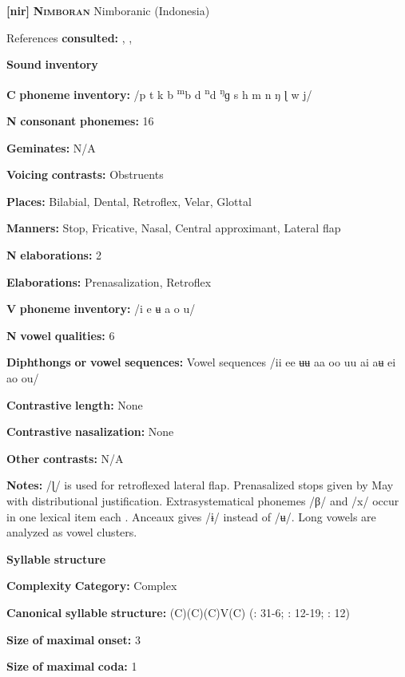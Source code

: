 \begin{styleBody}
\textbf{[nir]}   \textbf{\textsc{Nimboran}}  Nimboranic (Indonesia)

References \textbf{consulted:} \citet{Anceaux1965}, \citet{May1997}, \citet{MayMay1981}

\textbf{Sound} \textbf{inventory}

\textbf{C} \textbf{phoneme} \textbf{inventory:} /p t k b \textsuperscript{m}b d \textsuperscript{n}d \textsuperscript{ŋ}ɡ s h m n ŋ ɭ w j/

\textbf{N} \textbf{consonant} \textbf{phonemes:} 16

\textbf{Geminates:} N/A

\textbf{Voicing} \textbf{contrasts:} Obstruents

\textbf{Places:} Bilabial, Dental, Retroflex, Velar, Glottal

\textbf{Manners:} Stop, Fricative, Nasal, Central approximant, Lateral flap

\textbf{N} \textbf{elaborations:} 2

\textbf{Elaborations:} Prenasalization, Retroflex

\textbf{V} \textbf{phoneme} \textbf{inventory:} /i e ʉ a o u/

\textbf{N} \textbf{vowel} \textbf{qualities:} 6

\textbf{Diphthongs} \textbf{or} \textbf{vowel} \textbf{sequences:} Vowel sequences /ii ee ʉʉ aa oo uu ai aʉ ei ao ou/

\textbf{Contrastive} \textbf{length:} None

\textbf{Contrastive} \textbf{nasalization:} None

\textbf{Other} \textbf{contrasts:} N/A

\textbf{Notes:} /ɭ/ is used for retroflexed lateral flap. Prenasalized stops given by May with distributional justification. Extrasystematical phonemes /β/ and /x/ occur in one lexical item each \citep[9]{Anceaux1965}. Anceaux gives /ɨ/ instead of /ʉ/. Long vowels are analyzed as vowel clusters.

\textbf{Syllable} \textbf{structure}

\textbf{Complexity} \textbf{Category:} Complex

\textbf{Canonical} \textbf{syllable} \textbf{structure:} (C)(C)(C)V(C) (\citealt{Anceaux1965}: 31-6; \citealt{May1997}: 12-19; \citealt{MayMay1981}: 12)

\textbf{Size} \textbf{of} \textbf{maximal} \textbf{onset:} 3

\textbf{Size} \textbf{of} \textbf{maximal} \textbf{coda:} 1


\end{styleBody}
